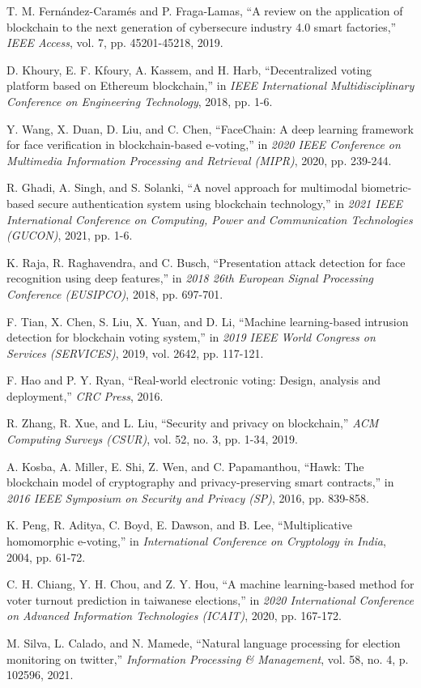 \documentclass[conference]{IEEEtran}
\begin{document}
\begin{thebibliography}{20}
 T. M. Fernández-Caramés and P. Fraga-Lamas, ``A review on the application of blockchain to the next generation of cybersecure industry 4.0 smart factories,'' \textit{IEEE Access}, vol. 7, pp. 45201-45218, 2019.

 D. Khoury, E. F. Kfoury, A. Kassem, and H. Harb, ``Decentralized voting platform based on Ethereum blockchain,'' in \textit{IEEE International Multidisciplinary Conference on Engineering Technology}, 2018, pp. 1-6.

 Y. Wang, X. Duan, D. Liu, and C. Chen, ``FaceChain: A deep learning framework for face verification in blockchain-based e-voting,'' in \textit{2020 IEEE Conference on Multimedia Information Processing and Retrieval (MIPR)}, 2020, pp. 239-244.

 R. Ghadi, A. Singh, and S. Solanki, ``A novel approach for multimodal biometric-based secure authentication system using blockchain technology,'' in \textit{2021 IEEE International Conference on Computing, Power and Communication Technologies (GUCON)}, 2021, pp. 1-6.

 K. Raja, R. Raghavendra, and C. Busch, ``Presentation attack detection for face recognition using deep features,'' in \textit{2018 26th European Signal Processing Conference (EUSIPCO)}, 2018, pp. 697-701.

 F. Tian, X. Chen, S. Liu, X. Yuan, and D. Li, ``Machine learning-based intrusion detection for blockchain voting system,'' in \textit{2019 IEEE World Congress on Services (SERVICES)}, 2019, vol. 2642, pp. 117-121.

 F. Hao and P. Y. Ryan, ``Real-world electronic voting: Design, analysis and deployment,'' \textit{CRC Press}, 2016.

 R. Zhang, R. Xue, and L. Liu, ``Security and privacy on blockchain,'' \textit{ACM Computing Surveys (CSUR)}, vol. 52, no. 3, pp. 1-34, 2019.

 A. Kosba, A. Miller, E. Shi, Z. Wen, and C. Papamanthou, ``Hawk: The blockchain model of cryptography and privacy-preserving smart contracts,'' in \textit{2016 IEEE Symposium on Security and Privacy (SP)}, 2016, pp. 839-858.

 K. Peng, R. Aditya, C. Boyd, E. Dawson, and B. Lee, ``Multiplicative homomorphic e-voting,'' in \textit{International Conference on Cryptology in India}, 2004, pp. 61-72.

 C. H. Chiang, Y. H. Chou, and Z. Y. Hou, ``A machine learning-based method for voter turnout prediction in taiwanese elections,'' in \textit{2020 International Conference on Advanced Information Technologies (ICAIT)}, 2020, pp. 167-172.

 M. Silva, L. Calado, and N. Mamede, ``Natural language processing for election monitoring on twitter,'' \textit{Information Processing \& Management}, vol. 58, no. 4, p. 102596, 2021.

\end{thebibliography}
\end{document}
